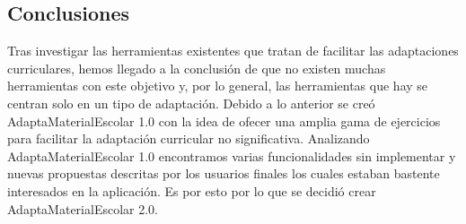 \subsection{Conclusiones}
Tras investigar las herramientas existentes que tratan de facilitar las adaptaciones curriculares, hemos llegado a la conclusión de que no existen muchas herramientas con este objetivo y, por lo general, las herramientas que hay se centran solo en un tipo de adaptación. Debido a lo anterior se creó AdaptaMaterialEscolar 1.0 con la idea de ofecer una amplia gama de ejercicios para facilitar la adaptación curricular no significativa. Analizando AdaptaMaterialEscolar 1.0 encontramos varias funcionalidades sin implementar y nuevas propuestas descritas por los usuarios finales los cuales estaban bastente interesados en la aplicación. Es por esto por lo que se decidió crear AdaptaMaterialEscolar 2.0.
